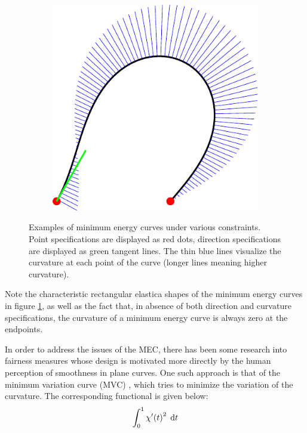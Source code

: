 \documentclass[a4paper]{article}
\begin{document}
\begin{figure}[htb]
\begin{subfigure}[b]{\textwidth / 3}
					\end{subfigure}%
					\begin{subfigure}[b]{\textwidth / 3}
						\includegraphics[width=\textwidth]{content/output/fairness_mec_3.pdf}
					\end{subfigure}
					\caption{Examples of minimum energy curves under various constraints. Point specifications are displayed as red dots, direction specifications are displayed as green tangent lines. The thin blue lines visualize the curvature at each point of the curve (longer lines meaning higher curvature).}
					\label{figure:minimum_energy_curve_examples}
				\end{figure}

				Note the characteristic rectangular elastica shapes of the minimum energy curves in figure \ref{figure:minimum_energy_curve_examples}, as well as the fact that, in absence of both direction and curvature specifications, the curvature of a minimum energy curve is always zero at the endpoints.

				In order to address the issues of the MEC, there has been some research into fairness measures whose design is motivated more directly by the human perception of smoothness in plane curves. One such approach is that of the minimum variation curve (MVC) \cite{thesis-mvc}, which tries to minimize the variation of the curvature. The corresponding functional is given below:
				\begin{equation*}
					\int_{0}^{1} \chi'\!\left( t \right)^2 \; \mathrm{d}t
				\end{equation*}
\end{document}
